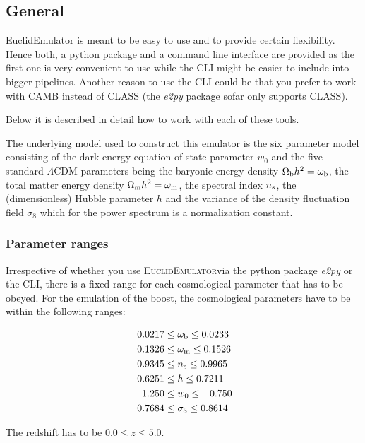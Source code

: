 \documentclass[american,11pt]{article}
\begin{document}
\subsection{General}
EuclidEmulator is meant to be easy to use and to provide certain flexibility. Hence both, a python package and a command line interface are provided as the first one is very convenient to use while the CLI might be easier to include into bigger pipelines. Another reason to use the CLI could be that you prefer to work with CAMB instead of CLASS (the \textit{e2py} package sofar only supports CLASS).

Below it is described in detail how to work with each of these tools.

The underlying model used to construct this emulator is the six parameter model consisting of the dark energy equation of state parameter $w_0$ and the five standard $\Lambda$CDM parameters being the baryonic energy density $\Omega_{\rm b}h^2=\omega_{\rm b}$, the total matter energy density $\Omega_{\rm m}h^2=\omega_{\rm m}$, the spectral index $n_{\rm s}$, the (dimensionless) Hubble parameter $h$ and the variance of the density fluctuation field $\sigma_8$ which for the power spectrum is a normalization constant.

\subsubsection{Parameter ranges}
Irrespective of whether you use \textsc{EuclidEmulator}via the python package \textit{e2py} or the CLI, there is a fixed range for each cosmological parameter that has to be obeyed. For the emulation of the boost, the cosmological parameters have to be within the following ranges:

\begin{equation}
\begin{split}
0.0217  &\leq \omega_{\rm b} \leq 0.0233\\
0.1326  &\leq \omega_{\rm m} \leq 0.1526\\
0.9345 &\leq n_{\rm s} \leq 0.9965\\
0.6251  &\leq h  \leq 0.7211\\
-1.250  &\leq w_0  \leq -0.750\\
0.7684 &\leq\sigma_8 \leq 0.8614\\
\end{split}
\end{equation}

The redshift has to be $0.0 \leq z \leq 5.0$.
\end{document}
